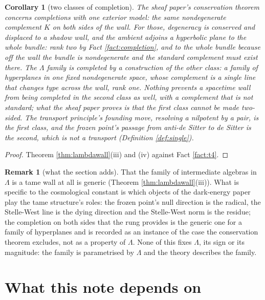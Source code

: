 \documentclass[11pt]{article}
\newtheorem{corollary}[theorem]{Corollary}
\theoremstyle{definition}
\newtheorem{remark}[theorem]{Remark}
\begin{document}
\begin{corollary}[two classes of completion]\label{cor:twowalls}
The sheaf paper's conservation theorem concerns completions with one exterior model: the same nondegenerate complement $K$ on both sides of the wall. For those, degeneracy is conserved and displaced to a shadow wall, and the ambient adjoins a hyperbolic plane to the whole bundle: rank two by Fact \ref{fact:completion}, and to the whole bundle because off the wall the bundle is nondegenerate and the standard complement must exist there. The $\Lambda$ family is completed by a construction of the other class: a family of hyperplanes in one fixed nondegenerate space, whose complement is a single line that changes type across the wall, rank one. Nothing prevents a spacetime wall from being completed in the second class as well, with a complement that is not standard; what the sheaf paper proves is that the first class cannot be made two-sided. The transport principle's founding move, resolving a nilpotent by a pair, is the first class, and the frozen point's passage from anti-de Sitter to de Sitter is the second, which is not a transport (Definition \ref{def:single}).
\end{corollary}

\begin{proof}
Theorem \ref{thm:lambdawall}(iii) and (iv) against Fact \ref{fact:t4}.
\end{proof}

\begin{remark}[what the section adds]\label{rem:t4earns}
That the family of intermediate algebras in $\Lambda$ is a tame wall at all is generic (Theorem \ref{thm:lambdawall}(iii)). What is specific to the cosmological constant is which objects of the dark-energy paper play the tame structure's roles: the frozen point's null direction is the radical, the Stelle-West line is the dying direction and the Stelle-West norm is the residue; the completion on both sides that the rung provides is the generic one for a family of hyperplanes and is recorded as an instance of the case the conservation theorem excludes, not as a property of $\Lambda$. None of this fixes $\Lambda$, its sign or its magnitude: the family is parametrised by $\Lambda$ and the theory describes the family.
\end{remark}

\section{What this note depends on}\label{sec:refute}
\end{document}
